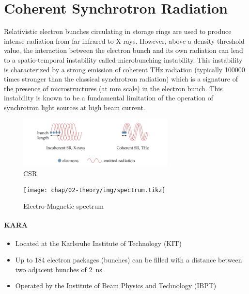 \section{Coherent Synchrotron Radiation}
Relativistic electron bunches circulating in storage rings are used to produce intense
radiation from far-infrared to X-rays. However, above a density threshold
value, the interaction between the electron bunch and its own radiation can lead
to a spatio-temporal instability called microbunching instability. This instability
is characterized by a strong emission of coherent THz radiation (typically 100000
times stronger than the classical synchrotron radiation) which is a signature of the
presence of microstructures (at mm scale) in the electron bunch. This instability is
known to be a fundamental limitation of the operation of synchrotron light sources
at high beam current.

\begin{figure}[H]
	\centering
	\includegraphics[width = 0.7\textwidth]{chap/02-theory/img/csr2.png}
	\caption{CSR \cite{rota2018}}
	\label{fig:csr}
\end{figure}



\begin{figure}[H]
	\centering
	\texttt{[image: chap/02-theory/img/spectrum.tikz]}
	\caption{Electro-Magnetic spectrum}
	\label{fig:spectrum}
\end{figure}





\paragraph{KARA}
\begin{itemize}
	\item Located at the Karlsruhe Institute of Technology (KIT)
	\item Up to 184 electron packages (bunches) can be filled with a distance between two adjacent bunches of \SI{2}{\nano \second}
	\item Operated by the Institute of Beam Physics and Technology (IBPT)
\end{itemize}

